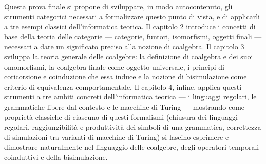 Questa prova finale si propone di sviluppare, in modo autocontenuto, gli strumenti categorici necessari a formalizzare questo punto di vista, e di applicarli a tre esempi classici dell'informatica teorica. Il capitolo 2 introduce i concetti di base della teoria delle categorie — categorie, funtori, isomorfismi, oggetti finali — necessari a dare un significato preciso alla nozione di coalgebra. Il capitolo 3 sviluppa la teoria generale delle coalgebre: la definizione di coalgebra e dei suoi omomorfismi, la coalgebra finale come oggetto universale, i principi di coricorsione e coinduzione che essa induce e la nozione di bisimulazione come criterio di equivalenza comportamentale. Il capitolo 4, infine, applica questi strumenti a tre ambiti concreti dell'informatica teorica — i linguaggi regolari, le grammatiche libere dal contesto e le macchine di Turing — mostrando come proprietà classiche di ciascuno di questi formalismi (chiusura dei linguaggi regolari, raggiungibilità e produttività dei simboli di una grammatica, correttezza di simulazioni tra varianti di macchine di Turing) si lascino esprimere e dimostrare naturalmente nel linguaggio delle coalgebre, degli operatori temporali coinduttivi e della bisimulazione.
